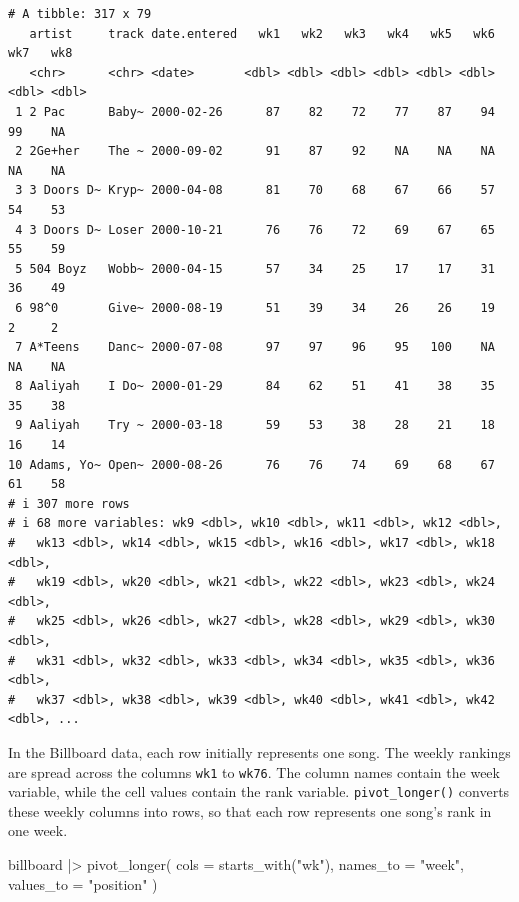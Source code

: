 \documentclass[
  letterpaper,
  DIV=11,
  numbers=noendperiod]{scrreprt}
\newenvironment{Shaded}{\begin{snugshade}}{\end{snugshade}}
\newcommand{\AttributeTok}[1]{\textcolor[rgb]{0.40,0.45,0.13}{#1}}
\newcommand{\FunctionTok}[1]{\textcolor[rgb]{0.28,0.35,0.67}{#1}}
\newcommand{\NormalTok}[1]{\textcolor[rgb]{0.00,0.23,0.31}{#1}}
\newcommand{\SpecialCharTok}[1]{\textcolor[rgb]{0.37,0.37,0.37}{#1}}
\newcommand{\StringTok}[1]{\textcolor[rgb]{0.13,0.47,0.30}{#1}}
\begin{document}
\begin{verbatim}
# A tibble: 317 x 79
   artist     track date.entered   wk1   wk2   wk3   wk4   wk5   wk6   wk7   wk8
   <chr>      <chr> <date>       <dbl> <dbl> <dbl> <dbl> <dbl> <dbl> <dbl> <dbl>
 1 2 Pac      Baby~ 2000-02-26      87    82    72    77    87    94    99    NA
 2 2Ge+her    The ~ 2000-09-02      91    87    92    NA    NA    NA    NA    NA
 3 3 Doors D~ Kryp~ 2000-04-08      81    70    68    67    66    57    54    53
 4 3 Doors D~ Loser 2000-10-21      76    76    72    69    67    65    55    59
 5 504 Boyz   Wobb~ 2000-04-15      57    34    25    17    17    31    36    49
 6 98^0       Give~ 2000-08-19      51    39    34    26    26    19     2     2
 7 A*Teens    Danc~ 2000-07-08      97    97    96    95   100    NA    NA    NA
 8 Aaliyah    I Do~ 2000-01-29      84    62    51    41    38    35    35    38
 9 Aaliyah    Try ~ 2000-03-18      59    53    38    28    21    18    16    14
10 Adams, Yo~ Open~ 2000-08-26      76    76    74    69    68    67    61    58
# i 307 more rows
# i 68 more variables: wk9 <dbl>, wk10 <dbl>, wk11 <dbl>, wk12 <dbl>,
#   wk13 <dbl>, wk14 <dbl>, wk15 <dbl>, wk16 <dbl>, wk17 <dbl>, wk18 <dbl>,
#   wk19 <dbl>, wk20 <dbl>, wk21 <dbl>, wk22 <dbl>, wk23 <dbl>, wk24 <dbl>,
#   wk25 <dbl>, wk26 <dbl>, wk27 <dbl>, wk28 <dbl>, wk29 <dbl>, wk30 <dbl>,
#   wk31 <dbl>, wk32 <dbl>, wk33 <dbl>, wk34 <dbl>, wk35 <dbl>, wk36 <dbl>,
#   wk37 <dbl>, wk38 <dbl>, wk39 <dbl>, wk40 <dbl>, wk41 <dbl>, wk42 <dbl>, ...
\end{verbatim}

In the Billboard data, each row initially represents one song. The
weekly rankings are spread across the columns \texttt{wk1} to
\texttt{wk76}. The column names contain the week variable, while the
cell values contain the rank variable. \texttt{pivot\_longer()} converts
these weekly columns into rows, so that each row represents one song's
rank in one week.

\begin{Shaded}
\begin{Highlighting}[]
\NormalTok{billboard }\SpecialCharTok{|\textgreater{}}
  \FunctionTok{pivot\_longer}\NormalTok{(}
    \AttributeTok{cols =} \FunctionTok{starts\_with}\NormalTok{(}\StringTok{"wk"}\NormalTok{),}
    \AttributeTok{names\_to =} \StringTok{"week"}\NormalTok{,}
    \AttributeTok{values\_to =} \StringTok{"position"}
\NormalTok{  )}
\end{Highlighting}
\end{Shaded}
\end{document}
